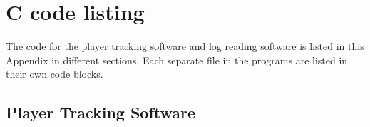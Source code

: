 \chapter{C code listing}
The code for the player tracking software and log reading software is listed in this Appendix in different sections. Each separate file in the programs are listed in their own code blocks.

\section{Player Tracking Software}

\lstset{language=c}
\lstset{basicstyle=\small}
\lstset{linewidth=\textwidth}
\lstset{commentstyle=\textit, stringstyle=\upshape,showspaces=false}
\lstset{frame=trBL,frameround=tttt}



